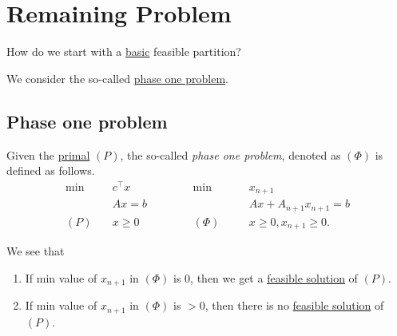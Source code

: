 \section{Remaining Problem}
\begin{problem}
How do we start with a \hyperref[def:basic-partition]{basic} feasible partition?
\end{problem}
\begin{answer}
	We consider the so-called \hyperref[def:phase-one-problem]{phase one problem}.
\end{answer}

\subsection{Phase one problem}
\begin{definition}\label{def:phase-one-problem}
	Given the \hyperref[def:primal]{primal} \((P)\), the so-called \emph{phase one problem}, denoted as \((\Phi)\) is defined as follows.
	\[
		\begin{alignedat}{5}
			\min~&c^{\top}x\qquad\qquad&&\min~ && x_{n+1}\\
			&Ax = b 				&&		&&Ax + A_{n+1}x_{n+1} = b              \\
			(P)\quad	&x\geq  0 	&&(\Phi)\quad&&x\geq 0, x_{n+1} \geq  0.
		\end{alignedat}
	\]
\end{definition}

\begin{remark}
	We see that
	\begin{enumerate}
		\item If min value of \(x_{n+1}\) in \((\Phi)\) is 0, then we get a \hyperref[def:feasible-solution]{feasible solution} of \((P)\).
		\item If min value of \(x_{n+1}\) in \((\Phi)\) is \(>0\), then there is no \hyperref[def:feasible-solution]{feasible solution} of \((P)\).
	\end{enumerate}
\end{remark}

